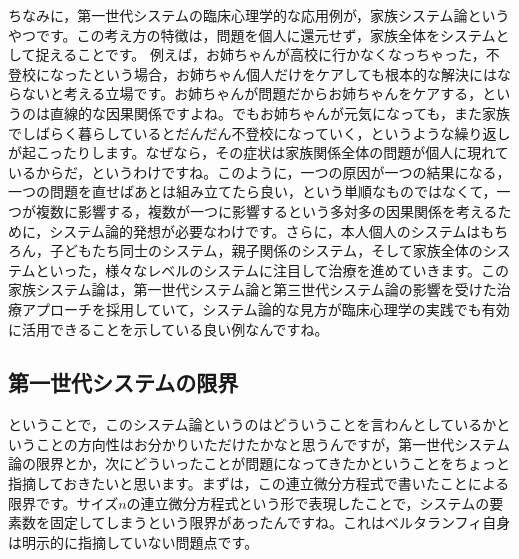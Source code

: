 \documentclass{ltjsbook}
\begin{document}
ちなみに，第一世代システムの臨床心理学的な応用例が，家族システム論というやつです。この考え方の特徴は，問題を個人に還元せず，家族全体をシステムとして捉えることです。
例えば，お姉ちゃんが高校に行かなくなっちゃった，不登校になったという場合，お姉ちゃん個人だけをケアしても根本的な解決にはならないと考える立場です。お姉ちゃんが問題だからお姉ちゃんをケアする，というのは直線的な因果関係ですよね。でもお姉ちゃんが元気になっても，また家族でしばらく暮らしているとだんだん不登校になっていく，というような繰り返しが起こったりします。なぜなら，その症状は家族関係全体の問題が個人に現れているからだ，というわけですね。このように，一つの原因が一つの結果になる，一つの問題を直せばあとは組み立てたら良い，という単順なものではなくて，一つが複数に影響する，複数が一つに影響するという多対多の因果関係を考えるために，システム論的発想が必要なわけです。さらに，本人個人のシステムはもちろん，子どもたち同士のシステム，親子関係のシステム，そして家族全体のシステムといった，様々なレベルのシステムに注目して治療を進めていきます。この家族システム論は，第一世代システム論と第三世代システム論の影響を受けた治療アプローチを採用していて，システム論的な見方が臨床心理学の実践でも有効に活用できることを示している良い例なんですね。

\subsection{第一世代システムの限界}

ということで，このシステム論というのはどういうことを言わんとしているかということの方向性はお分かりいただけたかなと思うんですが，第一世代システム論の限界とか，次にどういったことが問題になってきたかということをちょっと指摘しておきたいと思います。まずは，この連立微分方程式で書いたことによる限界です。サイズ$n$の連立微分方程式という形で表現したことで，システムの要素数を固定してしまうという限界があったんですね。これはベルタランフィ自身は明示的に指摘していない問題点です。
\end{document}
